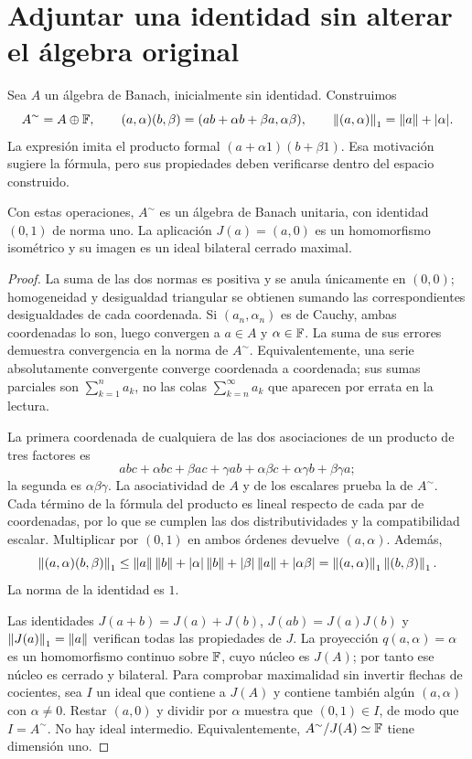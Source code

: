 \section{Adjuntar una identidad sin alterar el álgebra original}\label{lec:v3-20}

Sea $A$ un álgebra de Banach, inicialmente sin identidad. Construimos
\[
 A^{\sim}=A\oplus\mathbb F,\qquad
 (a,\alpha)(b,\beta)=(ab+\alpha b+\beta a,\alpha\beta),
 \qquad \left\lVert(a,\alpha)\right\rVert_1=\left\lVert a\right\rVert+|\alpha|.
\]
La expresión imita el producto formal $(a+\alpha1)(b+\beta1)$. Esa motivación sugiere la fórmula, pero sus propiedades deben verificarse dentro del espacio construido.

\begin{teorema}\label{v3:unitizacion}
Con estas operaciones, $A^{\sim}$ es un álgebra de Banach unitaria, con identidad $(0,1)$ de norma uno. La aplicación $J(a)=(a,0)$ es un homomorfismo isométrico y su imagen es un ideal bilateral cerrado maximal.
\end{teorema}
\begin{proof}
La suma de las dos normas es positiva y se anula únicamente en $(0,0)$; homogeneidad y desigualdad triangular se obtienen sumando las correspondientes desigualdades de cada coordenada. Si $(a_n,\alpha_n)$ es de Cauchy, ambas coordenadas lo son, luego convergen a $a\in A$ y $\alpha\in\mathbb F$. La suma de sus errores demuestra convergencia en la norma de $A^{\sim}$. Equivalentemente, una serie absolutamente convergente converge coordenada a coordenada; sus sumas parciales son $\sum_{k=1}^n a_k$, no las colas $\sum_{k=n}^\infty a_k$ que aparecen por errata en la lectura.

La primera coordenada de cualquiera de las dos asociaciones de un producto de tres factores es
\[
 abc+\alpha bc+\beta ac+\gamma ab
       +\alpha\beta c+\alpha\gamma b+\beta\gamma a;
\]
la segunda es $\alpha\beta\gamma$. La asociatividad de $A$ y de los escalares prueba la de $A^{\sim}$. Cada término de la fórmula del producto es lineal respecto de cada par de coordenadas, por lo que se cumplen las dos distributividades y la compatibilidad escalar. Multiplicar por $(0,1)$ en ambos órdenes devuelve $(a,\alpha)$. Además,
\[
 \left\lVert(a,\alpha)(b,\beta)\right\rVert_1
 \leq\left\lVert a\right\rVert\left\lVert b\right\rVert+|\alpha|\left\lVert b\right\rVert+|\beta|\left\lVert a\right\rVert+|\alpha\beta|
 =\left\lVert(a,\alpha)\right\rVert_1\left\lVert(b,\beta)\right\rVert_1.
\]
La norma de la identidad es $1$.

Las identidades $J(a+b)=J(a)+J(b)$, $J(ab)=J(a)J(b)$ y $\left\lVert J(a)\right\rVert_1=\left\lVert a\right\rVert$ verifican todas las propiedades de $J$. La proyección $q(a,\alpha)=\alpha$ es un homomorfismo continuo sobre $\mathbb F$, cuyo núcleo es $J(A)$; por tanto ese núcleo es cerrado y bilateral. Para comprobar maximalidad sin invertir flechas de cocientes, sea $I$ un ideal que contiene a $J(A)$ y contiene también algún $(a,\alpha)$ con $\alpha\ne0$. Restar $(a,0)$ y dividir por $\alpha$ muestra que $(0,1)\in I$, de modo que $I=A^{\sim}$. No hay ideal intermedio. Equivalentemente, $A^{\sim}/J(A)\simeq\mathbb F$ tiene dimensión uno.
\end{proof}

